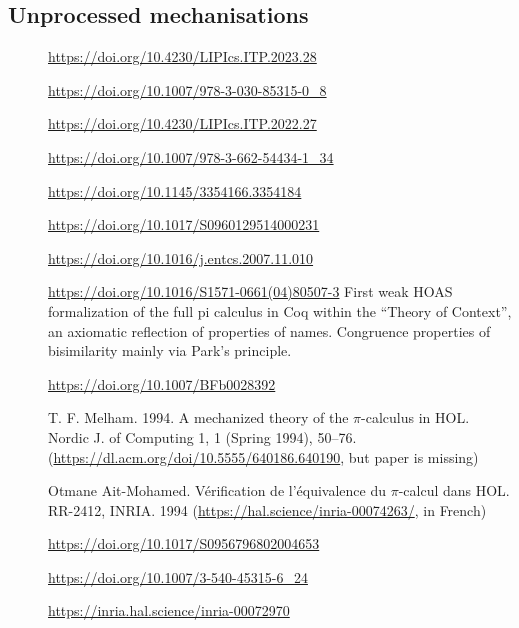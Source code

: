 \subsection{Unprocessed mechanisations}
\begin{description}
\item[\cite{Tirore:2023}]                 \url{https://doi.org/10.4230/LIPIcs.ITP.2023.28}
\item[\cite{Cruz-Filipe2021}]             \url{https://doi.org/10.1007/978-3-030-85315-0_8}
\item[\cite{Pohjola2022}]                 \url{https://doi.org/10.4230/LIPIcs.ITP.2022.27}
\item[\cite{Tassarotti2017}]              \url{https://doi.org/10.1007/978-3-662-54434-1_34}
\item[\cite{Thiemann2019}]                \url{https://doi.org/10.1145/3354166.3354184}
\item[\cite{Goto2016}]                    \url{https://doi.org/10.1017/S0960129514000231}
\item[\cite{Affeldt2008}]                 \url{https://doi.org/10.1016/j.entcs.2007.11.010}
\item[\cite{Honsell2001}]
  \url{https://doi.org/10.1016/S1571-0661(04)80507-3} First weak HOAS
  formalization of the full pi calculus in Coq within the ``Theory of
  Context'', an axiomatic reflection of properties of
  names. Congruence properties of bisimilarity mainly via Park's
  principle.
\item[\cite{Hirschkoff1997}]              \url{https://doi.org/10.1007/BFb0028392}
\item[\cite{Melham1994}]                  T. F. Melham. 1994. A mechanized theory of the $\pi$-calculus in HOL. Nordic J. of Computing 1, 1 (Spring 1994), 50–76. (\url{https://dl.acm.org/doi/10.5555/640186.640190}, but paper is missing)
\item[\cite{Ait-Mohamed1994}]             Otmane Ait-Mohamed. Vérification de l'équivalence du $\pi$-calcul dans HOL. RR-2412, INRIA. 1994 (\url{https://hal.science/inria-00074263/}, in French)
\item[\cite{Rockl2003}]                   \url{https://doi.org/10.1017/S0956796802004653}
\item[\cite{Rockl2001}]                   \url{https://doi.org/10.1007/3-540-45315-6_24}
\item[\cite{Henry-Greard1999}]            \url{https://inria.hal.science/inria-00072970}

\end{description}

